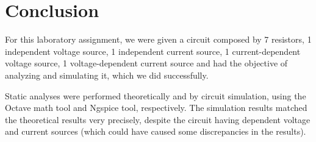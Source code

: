 \section{Conclusion}
\label{sec:conclusion}


For this laboratory assignment, we were given a circuit composed by 7 resistors, 1 
independent voltage source, 1 independent current source, 1 current-dependent voltage
source, 1 voltage-dependent current source and had the objective of analyzing and simulating
it, which we did successfully. 

Static analyses were performed theoretically and by circuit simulation,
using the Octave math tool and Ngspice tool, respectively. The simulation results matched
the theoretical results very precisely, despite the circuit having dependent voltage and
current sources (which could have caused some discrepancies in the results).

